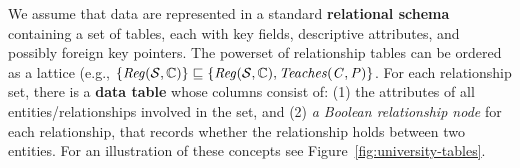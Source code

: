 \documentclass{article}
\begin{document}
We assume that data are represented in a standard \textbf{relational schema} containing a set of tables, each with key fields, %
descriptive attributes, and possibly foreign key pointers. 
%
The powerset of relationship tables can be ordered as a lattice (e.g., $\{\it{Reg}(\mathcal{S},\mathbb{C})\} \sqsubseteq \{\it{Reg}(\mathcal{S},\mathbb{C}),\it{Teaches}(C,P)\}$. For each relationship set, there is a \textbf{data table} whose columns consist of: (1) the attributes of all entities/relationships involved in the set, and (2) {\em  a Boolean relationship node} for each relationship, that records whether the relationship holds between two entities. For an illustration of these concepts see Figure~\ref{fig:university-tables}.
 
\end{document}
